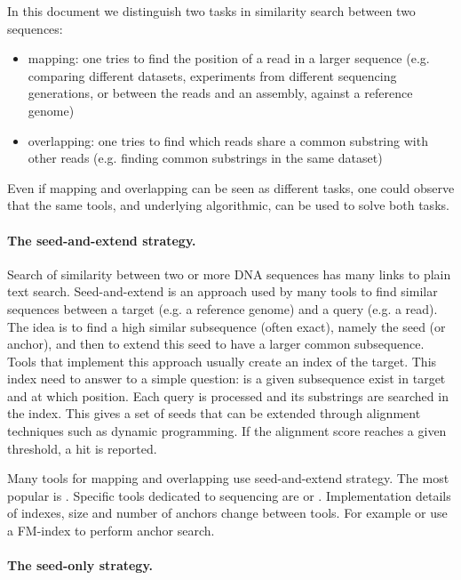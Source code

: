 \documentclass[main.tex]{subfiles}
\begin{document}
In this document we distinguish two tasks in similarity search between two sequences:
\begin{itemize}
    \item mapping: one tries to find the position of a read in a larger sequence (e.g. comparing different datasets, experiments from different sequencing generations, or between the reads and an assembly, against a reference genome)
    \item overlapping: one tries to find which reads share a common substring with other reads (e.g. finding common substrings in the same dataset) 
\end{itemize}
Even if mapping and overlapping can be seen as different tasks, one could observe that the same tools, and underlying algorithmic, can be used to solve both tasks.


\paragraph{The seed-and-extend strategy.} 
Search of similarity between two or more DNA sequences has many links to plain text search.
Seed-and-extend is an approach used by many tools to find similar sequences between a target (e.g. a reference genome) and a query (e.g. a read). The idea is to find a high similar subsequence (often exact), namely the seed (or anchor), and then to extend this seed to have a larger common subsequence. Tools that implement this approach usually create an index of the target. This index need to answer to a simple question: is a given subsequence exist in target and at which position. Each query is processed and its substrings are searched in the index. This gives a set of seeds that can be extended through alignment techniques such as dynamic programming. If the alignment score reaches a given threshold, a hit is reported.

Many tools for mapping and overlapping use seed-and-extend strategy. The most popular is  \cite{blast_one, blast_two}. Specific tools dedicated to sequencing are  \cite{bwa_mem} or  \cite{blasr}. Implementation details of indexes, size and number of anchors change between tools. For example  or  use a FM-index \cite{fm-index} to perform anchor search.

\paragraph{The seed-only strategy.}
\end{document}
